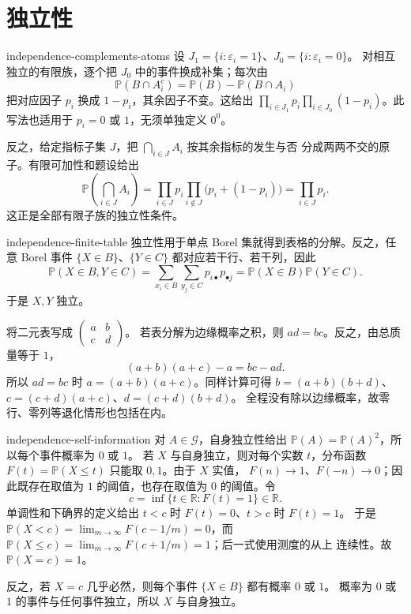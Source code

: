 \chapter{独立性}

\begin{solution}{independence-complements-atoms}
设 $J_1=\{i:\varepsilon_i=1\}$、$J_0=\{i:\varepsilon_i=0\}$。
对相互独立的有限族，逐个把 $J_0$ 中的事件换成补集；每次由
\[
 \mathbb P(B\cap A_i^c)=\mathbb P(B)-\mathbb P(B\cap A_i)
\]
把对应因子 $p_i$ 换成 $1-p_i$，其余因子不变。这给出
$\prod_{i\in J_1}p_i\prod_{i\in J_0}(1-p_i)$。此写法也适用于
$p_i=0$ 或 $1$，无须单独定义 $0^0$。

反之，给定指标子集 $J$，把 $\bigcap_{i\in J}A_i$ 按其余指标的发生与否
分成两两不交的原子。有限可加性和题设给出
\[
 \mathbb P\left(\bigcap_{i\in J}A_i\right)
 =\prod_{i\in J}p_i\prod_{i\notin J}\bigl(p_i+(1-p_i)\bigr)
 =\prod_{i\in J}p_i.
\]
这正是全部有限子族的独立性条件。
\end{solution}

\begin{solution}{independence-finite-table}
独立性用于单点 Borel 集就得到表格的分解。反之，任意 Borel 事件
$\{X\in B\}$、$\{Y\in C\}$ 都对应若干行、若干列，因此
\[
 \mathbb P(X\in B,Y\in C)
 =\sum_{x_i\in B}\sum_{y_j\in C}p_{i\bullet}p_{\bullet j}
 =\mathbb P(X\in B)\mathbb P(Y\in C).
\]
于是 $X,Y$ 独立。

将二元表写成 $\left(\begin{smallmatrix}a&b\\c&d\end{smallmatrix}\right)$。
若表分解为边缘概率之积，则 $ad=bc$。反之，由总质量等于 $1$，
\[
 (a+b)(a+c)-a=bc-ad.
\]
所以 $ad=bc$ 时 $a=(a+b)(a+c)$。同样计算可得
$b=(a+b)(b+d)$、$c=(c+d)(a+c)$、$d=(c+d)(b+d)$。
全程没有除以边缘概率，故零行、零列等退化情形也包括在内。
\end{solution}

\begin{solution}{independence-self-information}
对 $A\in\mathcal G$，自身独立性给出
$\mathbb P(A)=\mathbb P(A)^2$，所以每个事件概率为 $0$ 或 $1$。
若 $X$ 与自身独立，则对每个实数 $t$，分布函数
$F(t)=\mathbb P(X\le t)$ 只能取 $0,1$。由于 $X$ 实值，
$F(n)\to1$、$F(-n)\to0$；因此既存在取值为 $1$ 的阈值，也存在取值为
$0$ 的阈值。令
\[
 c=\inf\{t\in\mathbb R:F(t)=1\}\in\mathbb R.
\]
单调性和下确界的定义给出 $t<c$ 时 $F(t)=0$、$t>c$ 时 $F(t)=1$。
于是 $\mathbb P(X<c)=\lim_{m\to\infty}F(c-1/m)=0$，而
$\mathbb P(X\le c)=\lim_{m\to\infty}F(c+1/m)=1$；后一式使用测度的从上
连续性。故 $\mathbb P(X=c)=1$。

反之，若 $X=c$ 几乎必然，则每个事件 $\{X\in B\}$ 都有概率 $0$ 或 $1$。
概率为 $0$ 或 $1$ 的事件与任何事件独立，所以 $X$ 与自身独立。
\end{solution}

